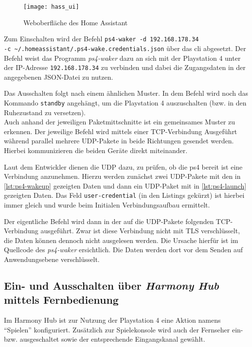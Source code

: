 \begin{figure}[h!]
    \centering
    \texttt{[image: hass\_ui]}
    \caption{Weboberfläche des Home Assistant}\label{fig:hass-ui}
\end{figure}

Zum Einschalten wird der Befehl \texttt{ps4-waker -d 192.168.178.34 \\ -c \textasciitilde{}/.homeassistant/.ps4-wake.credentials.json} über das \ac{cli} abgesetzt.
Der Befehl weist das Programm \textit{ps4-waker} dazu an sich mit der Playstation 4 unter der IP-Adresse \texttt{192.168.178.34} zu verbinden und dabei die Zugangsdaten in der angegebenen JSON-Datei zu nutzen.

Das Ausschalten folgt nach einem ähnlichen Muster.
In dem Befehl wird noch das Kommando \texttt{standby} angehängt,
um die Playstation 4 auszuschalten (bzw. in den Ruhezustand zu versetzen). \\

Auch anhand der jeweiligen Paketmittschnitte ist ein gemeinsames Muster zu erkennen.
Der jeweilige Befehl wird mittels einer TCP-Verbindung Ausgeführt
während parallel mehrere UDP-Pakete in beide Richtungen gesendet werden.
Hierbei kommunizieren die beiden Geräte direkt miteinander.

Laut dem Entwickler dienen die UDP dazu, zu prüfen, ob die \ac{ps4} bereit ist eine Verbindung anzunehmen.
Hierzu werden zunächst zwei UDP-Pakete mit den in \autoref{lst:ps4-wakeup} gezeigten Daten
und dann ein UDP-Paket mit in \autoref{lst:ps4-launch} gezeigten Daten.
Das Feld \texttt{user-credential} (in den Listings gekürzt) ist hierbei immer gleich
und wurde beim Initialen Verbindungsaufbau ermittelt.





Der eigentliche Befehl wird dann in der auf die UDP-Pakete folgenden TCP-Verbindung ausgeführt.
Zwar ist diese Verbindung nicht mit TLS verschlüsselt, die Daten können dennoch nicht ausgelesen werden.
Die Ursache hierfür ist im Quellcode des \textit{ps4-waker} ersichtlich.
Die Daten werden dort vor dem Senden auf Anwendungsebene verschlüsselt.

\subsection{Ein- und Ausschalten über \textit{Harmony Hub} mittels Fernbedienung}
Im Harmony Hub ist zur Nutzung der Playstation 4 eine Aktion namens \enquote{Spielen} konfiguriert.
Zusätzlich zur Spielekonsole wird auch der Fernseher ein- bzw. ausgeschaltet sowie der entsprechende Eingangskanal gewählt.

